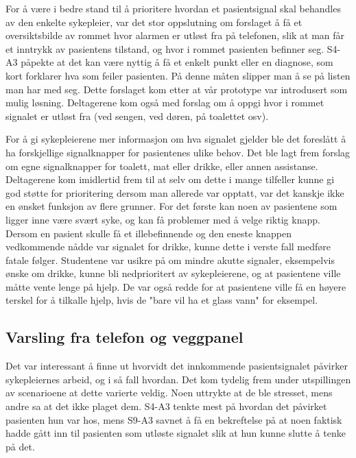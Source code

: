 \noindent
For å være i bedre stand til å prioritere hvordan et pasientsignal skal behandles av den enkelte sykepleier, var det stor oppslutning om forslaget å få et oversiktsbilde av rommet hvor alarmen er utløst fra på telefonen, slik at man får et inntrykk av pasientens tilstand, og hvor i rommet pasienten befinner seg. S4-A3 påpekte at det kan være nyttig å få et enkelt punkt eller en diagnose, som kort forklarer hva som feiler pasienten. På denne måten slipper man å se på listen man har med seg. Dette forslaget kom etter at vår prototype var introdusert som mulig løsning. Deltagerene kom også med forslag om å oppgi hvor i rommet signalet er utløst fra (ved sengen, ved døren, på toalettet osv). 

\noindent
For å gi sykepleierene mer informasjon om hva signalet gjelder ble det foreslått å ha forskjellige signalknapper for pasientenes ulike behov. Det ble lagt frem forslag om egne signalknapper for toalett, mat eller drikke, eller annen assistanse. Deltagerene kom imidlertid frem til at selv om dette i mange tilfeller kunne gi god støtte for prioritering dersom man allerede var opptatt, var det kanskje ikke en ønsket funksjon av flere grunner. For det første kan noen av pasientene som ligger inne være svært syke, og kan få problemer med å velge riktig knapp. Dersom en pasient skulle få et illebefinnende og den eneste knappen vedkommende nådde var signalet for drikke, kunne dette i verste fall medføre fatale følger. Studentene var usikre på om mindre akutte signaler, eksempelvis ønske om drikke, kunne bli nedprioritert av sykepleierene, og at pasientene ville måtte vente lenge på hjelp. De var også redde for at pasientene ville få en høyere terskel for å tilkalle hjelp, hvis de "bare vil ha et glass vann" for eksempel.

\subsection{Varsling fra telefon og veggpanel}
Det var interessant å finne ut hvorvidt det innkommende pasientsignalet påvirker sykepleiernes arbeid, og i så fall hvordan. Det kom tydelig frem under utspillingen av scenarioene at dette varierte veldig. Noen uttrykte at de ble stresset, mens andre sa at det ikke plaget dem. S4-A3 tenkte mest på hvordan det påvirket pasienten hun var hos, mens S9-A3 savnet å få en bekreftelse på at noen faktisk hadde gått inn til pasienten som utløste signalet slik at hun kunne slutte å tenke på det. 

